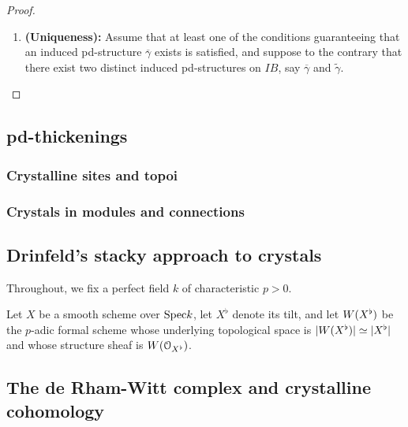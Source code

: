 \begin{proof}
\begin{enumerate}
\begin{enumerate}
                                \end{enumerate}
                            \item \textbf{(Uniqueness):} Assume that at least one of the conditions guaranteeing that an induced pd-structure $\overline{\gamma}$ exists is satisfied, and suppose to the contrary that there exist two distinct induced pd-structures on $IB$, say $\overline{\gamma}$ and $\tilde{\gamma}$.
                        \end{enumerate}
                    \end{proof}
                    
        \subsection{pd-thickenings}
            \subsubsection{Crystalline sites and topoi}
            
            \subsubsection{Crystals in modules and connections}
                
        \subsection{Drinfeld's stacky approach to crystals}
            \begin{convention}
                Throughout, we fix a perfect field $k$ of characteristic $p > 0$.
            \end{convention}
            
            Let $X$ be a smooth scheme over $\mathrm{Spec} k$, let $X^{\flat}$ denote its tilt, and let $W(X^{\flat})$ be the $p$-adic formal scheme whose underlying topological space is $|W(X^{\flat})| \simeq |X^{\flat}|$ and whose structure sheaf is $W(\mathcal{O}_{X^{\flat}})$. 
        
        \subsection{The de Rham-Witt complex and crystalline cohomology}
        
